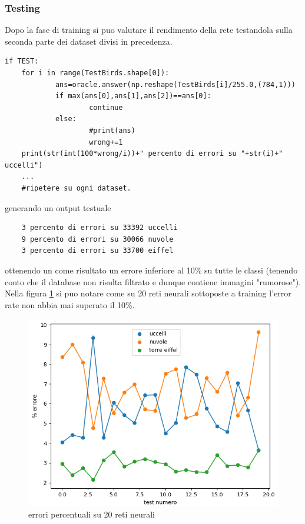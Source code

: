 \documentclass[12pt]{article}
\begin{document}
\subsubsection{Testing}
Dopo la fase di training si puo valutare il rendimento della rete testandola sulla seconda parte dei dataset divisi in precedenza.
\begin{lstlisting}[language=myPython]
if TEST:
	for i in range(TestBirds.shape[0]):
			ans=oracle.answer(np.reshape(TestBirds[i]/255.0,(784,1)))
			if max(ans[0],ans[1],ans[2])==ans[0]:
					continue
			else:
					#print(ans)
					wrong+=1
	print(str(int(100*wrong/i))+" percento di errori su "+str(i)+" uccelli")
	...
	#ripetere su ogni dataset.
\end{lstlisting}
generando un output testuale
\begin{verbatim}
	3 percento di errori su 33392 uccelli
	9 percento di errori su 30066 nuvole
	3 percento di errori su 33700 eiffel
\end{verbatim}
ottenendo un come risultato un errore inferiore al 10\% su tutte le classi (tenendo conto che il database non risulta filtrato e dunque contiene immagini "rumorose").
\newpage
Nella figura \ref{fig:error} si puo notare come su 20 reti neurali sottoposte a training l'error rate non abbia mai superato il 10\%.
\begin{figure}[h!]
	\centering
	\includegraphics[width=15 cm]{errorRate2.png}
	\caption{errori percentuali su 20 reti neurali}
	\label{fig:error}
\end{figure}




\newpage
\end{document}
